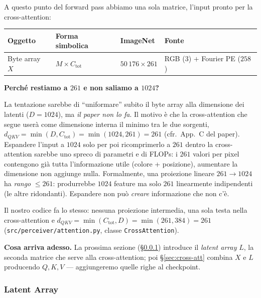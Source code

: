 \documentclass[
  11pt,
]{article}
\begin{document}
\begin{notabox}[title={\textbf{Checkpoint dimensioni --- fine \S1.4.3}}]
A questo punto del forward pass abbiamo una sola matrice, l'input pronto per la cross-attention:

\medskip
\begin{center}
\begin{tabular}{@{}llll@{}}
\toprule
\textbf{Oggetto} & \textbf{Forma simbolica} & \textbf{ImageNet} & \textbf{Fonte} \\
\midrule
Byte array $X$ & $M \times C_{\text{tot}}$ & $50\,176 \times 261$ & RGB ($3$) $+$ Fourier PE ($258$) \\
\bottomrule
\end{tabular}
\end{center}

\medskip
\textbf{Perché restiamo a $261$ e non saliamo a $1024$?}

La tentazione sarebbe di ``uniformare'' subito il byte array alla dimensione dei latenti ($D = 1024$), ma \emph{il paper non lo fa}. Il motivo è che la cross-attention che segue userà come dimensione interna il minimo tra le due sorgenti, $d_{QKV} = \min(D, C_{\text{tot}}) = \min(1024, 261) = 261$ (cfr.\ App.\ C del paper). Espandere l'input a $1024$ solo per poi ricomprimerlo a $261$ dentro la cross-attention sarebbe uno spreco di parametri e di FLOPs: i $261$ valori per pixel contengono già tutta l'informazione utile (colore + posizione), aumentare la dimensione non aggiunge nulla. Formalmente, una proiezione lineare $261 \to 1024$ ha \emph{rango} $\le 261$: produrrebbe $1024$ feature ma solo $261$ linearmente indipendenti (le altre ridondanti). Espandere non può \emph{creare} informazione che non c'è.

Il nostro codice fa lo stesso: nessuna proiezione intermedia, una sola testa nella cross-attention e $d_{QKV} = \min(C_{\text{tot}}, D) = \min(261, 384) = 261$ (\texttt{src/perceiver/attention.py}, classe \texttt{CrossAttention}).

\medskip
\textbf{Cosa arriva adesso.} La prossima sezione (\S\ref{sec:latent-array}) introduce il \emph{latent array} $L$, la seconda matrice che serve alla cross-attention; poi \S\ref{sec:cross-att} combina $X$ e $L$ producendo $Q, K, V$ --- aggiungeremo quelle righe al checkpoint.
\end{notabox}

\subsubsection{Latent Array}
\label{sec:latent-array}
\end{document}
